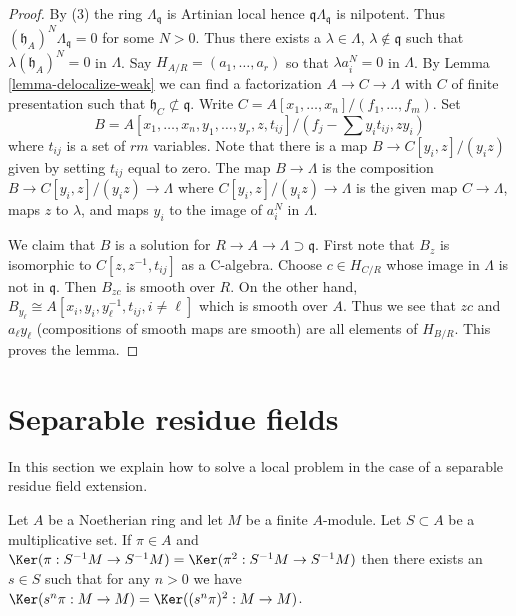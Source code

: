 \begin{proof}
By (3) the ring $\Lambda_\mathfrak q$ is Artinian local hence
$\mathfrak q\Lambda_\mathfrak q$ is nilpotent. Thus
$(\mathfrak h_A)^N \Lambda_\mathfrak q = 0$ for some $N > 0$.
Thus there exists a $\lambda \in \Lambda$, $\lambda \not \in \mathfrak q$
such that $\lambda (\mathfrak h_A)^N = 0$ in $\Lambda$.
Say $H_{A/R} = (a_1, \ldots, a_r)$ so that $\lambda a_i^N = 0$
in $\Lambda$. By Lemma \ref{lemma-delocalize-weak} we can find a factorization
$A \to C \to \Lambda$ with $C$ of finite presentation such that
$\mathfrak h_C \not \subset \mathfrak q$.
Write $C = A[x_1, \ldots, x_n]/(f_1, \ldots, f_m)$.
Set
$$
B = A[x_1, \ldots, x_n, y_1, \ldots, y_r, z, t_{ij}]/
(f_j - \sum y_i t_{ij}, zy_i)
$$
where $t_{ij}$ is a set of $rm$ variables.
Note that there is a map $B \to C[y_i, z]/(y_iz)$ given by setting $t_{ij}$
equal to zero. The map $B \to \Lambda$ is the composition
$B \to C[y_i, z]/(y_iz) \to \Lambda$ where $C[y_i, z]/(y_iz) \to \Lambda$
is the given map $C \to \Lambda$, maps $z$ to $\lambda$, and maps
$y_i$ to the image of $a_i^N$ in $\Lambda$.

\medskip\noindent
We claim that $B$ is a solution for $R \to A \to \Lambda \supset \mathfrak q$.
First note that $B_z$ is isomorphic to $C[z, z^{-1}, t_{ij}]$
as a C-algebra. Choose $c \in H_{C/R}$ whose image in $\Lambda$ is not in $\mathfrak q$. Then $B_{zc}$ is smooth over $R$. On the other hand,
$B_{y_\ell} \cong A[x_i, y_i, y_\ell^{-1}, t_{ij}, i \not = \ell]$
which is smooth over $A$. Thus we see that $zc$ and $a_\ell y_\ell$
(compositions of smooth maps are smooth) are all
elements of $H_{B/R}$. This proves the lemma.
\end{proof}




\section{Separable residue fields}
\label{section-separable}

\noindent
In this section we explain how to solve a local problem in the case
of a separable residue field extension.

\begin{lemma}[Ogoma]
\label{lemma-ogoma}
Let $A$ be a Noetherian ring and let $M$ be a finite $A$-module.
Let $S \subset A$ be a multiplicative set. If $\pi \in A$ and
$\Ker(\pi : S^{-1}M \to S^{-1}M) =
\Ker(\pi^2 : S^{-1}M \to S^{-1}M)$
then there exists an $s \in S$ such that for any $n > 0$ we have
$\Ker(s^n\pi : M \to M) = \Ker((s^n\pi)^2 : M \to M)$.
\end{lemma}

